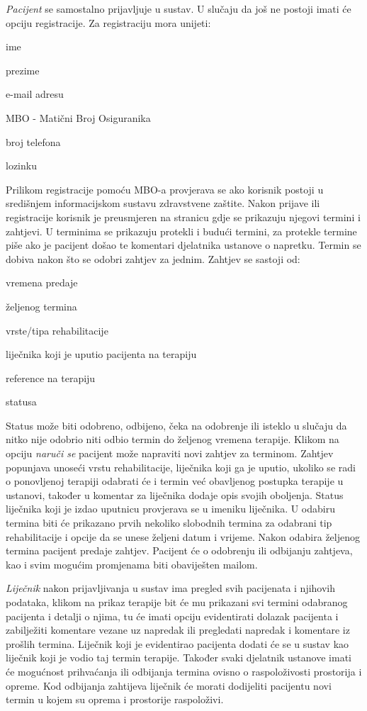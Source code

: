 		\textit{Pacijent} se samostalno prijavljuje u sustav. U slučaju da još ne postoji imati će opciju registracije. Za registraciju mora unijeti: 
		\begin{packed_item}
			\item ime
			\item prezime
			\item e-mail adresu
			\item MBO - Matični Broj Osiguranika
			\item broj telefona
			\item lozinku
		\end{packed_item}
		Prilikom registracije pomoću MBO-a provjerava se ako korisnik postoji u središnjem informacijskom sustavu zdravstvene zaštite.
		Nakon prijave ili registracije korisnik je preusmjeren na stranicu gdje se prikazuju njegovi termini i zahtjevi. U terminima se prikazuju protekli i budući termini, za protekle termine piše ako je pacijent došao te komentari djelatnika ustanove o napretku. Termin se dobiva nakon što se odobri zahtjev za jednim.		
		Zahtjev se sastoji od:
		\begin{packed_item}
			\item vremena predaje
			\item željenog termina
			\item vrste/tipa rehabilitacije
			\item liječnika koji je uputio pacijenta na terapiju
			\item reference na terapiju
			\item statusa
		\end{packed_item}
		Status može biti odobreno, odbijeno, čeka na odobrenje ili isteklo u slučaju da nitko nije odobrio niti odbio termin do željenog vremena terapije.
		Klikom na opciju \textit{naruči se} pacijent može napraviti novi zahtjev za terminom. Zahtjev popunjava unoseći vrstu rehabilitacije, liječnika koji ga je uputio, ukoliko se radi o ponovljenoj terapiji odabrati će i termin već obavljenog postupka terapije u ustanovi, također u komentar za liječnika dodaje opis svojih oboljenja. Status liječnika koji je izdao uputnicu provjerava se u imeniku liječnika. U odabiru termina biti će prikazano prvih nekoliko slobodnih termina za odabrani tip rehabilitacije i opcije da se unese željeni datum i vrijeme. Nakon odabira željenog termina pacijent predaje zahtjev. Pacijent će o odobrenju ili odbijanju zahtjeva, kao i svim mogućim promjenama biti obaviješten mailom.
		
		\textit{Liječnik} nakon prijavljivanja u sustav ima pregled svih pacijenata i njihovih podataka, klikom na prikaz terapije bit će mu prikazani svi termini odabranog pacijenta i detalji o njima, tu će imati opciju evidentirati dolazak pacijenta i zabilježiti komentare vezane uz napredak ili pregledati napredak i komentare iz prošlih termina. Liječnik koji je evidentirao pacijenta dodati će se u sustav kao liječnik koji je vodio taj termin terapije. Također svaki djelatnik ustanove imati će mogućnost prihvaćanja ili odbijanja termina ovisno o raspoloživosti prostorija i opreme. Kod odbijanja zahtijeva liječnik će morati dodijeliti pacijentu novi termin u kojem su oprema i prostorije raspoloživi.
		

